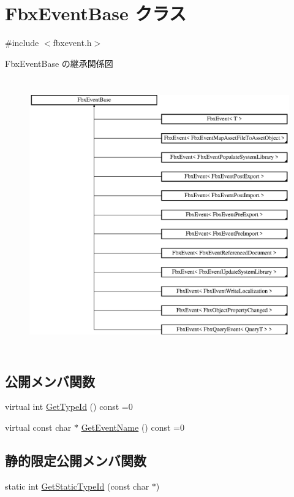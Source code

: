 \hypertarget{class_fbx_event_base}{}\section{Fbx\+Event\+Base クラス}
\label{class_fbx_event_base}


{\ttfamily \#include $<$fbxevent.\+h$>$}

Fbx\+Event\+Base の継承関係図\begin{figure}[H]
\begin{center}
\leavevmode
\includegraphics[height=11.779935cm]{class_fbx_event_base}
\end{center}
\end{figure}
\subsection*{公開メンバ関数}
\begin{DoxyCompactItemize}
\item 
virtual int \hyperlink{class_fbx_event_base_ac7a558ec38bc899bd705786620582b8b}{Get\+Type\+Id} () const =0
\item 
virtual const char $\ast$ \hyperlink{class_fbx_event_base_a94c1acf878d522042b327abf0c129f10}{Get\+Event\+Name} () const =0
\end{DoxyCompactItemize}
\subsection*{静的限定公開メンバ関数}
\begin{DoxyCompactItemize}
\item 
static int \hyperlink{class_fbx_event_base_a57cde15f6d1c6567bc8dbafc1658bcc5}{Get\+Static\+Type\+Id} (const char $\ast$)
\end{DoxyCompactItemize}

